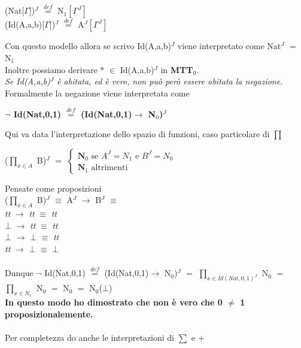 \begin{enumerate}
\begin{center}
(Nat[$\Gamma$])$^J$ ${\overset{\mathit{def}}{=}}$ N$_1[\Gamma^J]$\\
(Id(A,a,b)[$\Gamma$])$^J$ ${\overset{\mathit{def}}{=}}$ A$^J[\Gamma^J]$
\end{center}
\noindent
Con questo modello allora se scrivo Id(A,a,b)$^J$ viene interpretato come Nat$^J$ $=$ N$_1$\\
Inoltre possiamo derivare $\ast$ $\in$ Id(A,a,b)$^J$ in \textbf{MTT$_0$}.\\
\textit{Se Id(A,a,b)$^J$ \`e abitata, ed \`e vero, non pu\`o per\`o essere abitata la negazione.} Formalmente la negazione viene interpretata come
\begin{center}\textbf{$\neg$ Id(Nat,0,1) ${\overset{\mathit{def}}{=}}$ (Id(Nat,0,1)$\rightarrow$ N$_0$)$^J$ }\end{center}
Qui va data l'interpretazione dello spazio di funzioni, caso particolare di {\scriptsize$\prod$}
\begin{center}
($\prod\limits_{x \in A}$ B)$^J$ $=$
$
\begin{cases}
\textbf{N}_0\text{ se } A^J =  N_1  \text{ e } B^J = N_0\\
\textbf{N}_1 \text{ altrimenti}
\end{cases}
$
\end{center}
\noindent
Pensate come proposizioni \\
($\prod\limits_{x \in A}$ B)$^J$ $\equiv$ A$^J$ $\rightarrow$ B$^J$ $\equiv$\\
\textit{tt} $\rightarrow$ \textit{tt} $\equiv$ \textit{tt}\\
$\bot$ $\rightarrow$ \textit{tt} $\equiv$ \textit{tt}\\
$\bot$ $\rightarrow$ $\bot$ $\equiv$ \textit{tt}\\
\textit{tt} $\rightarrow$ $\bot$ $\equiv$ $\bot$\\\\
\noindent
Dunque $\neg$ Id(Nat,0,1) ${\overset{\mathit{def}}{=}}$ (Id(Nat,0,1)$\rightarrow$ N$_0$)$^J$ $=$ $\prod\limits_{x \in Id(Nat,0,1)^J}$ N$_0$ $=$ $\prod\limits_{x \in N_1}$ N$_0$ $=$ N$_0$ $=$ N$_0$($\bot$)\\
\textbf{In questo modo ho dimostrato che non \`e vero che 0 $\neq$ 1 proposizionalemente.}\\\\
\noindent
Per completezza do anche le interpretazioni di  {\scriptsize}$\sum$ e  $+$


\end{enumerate}
